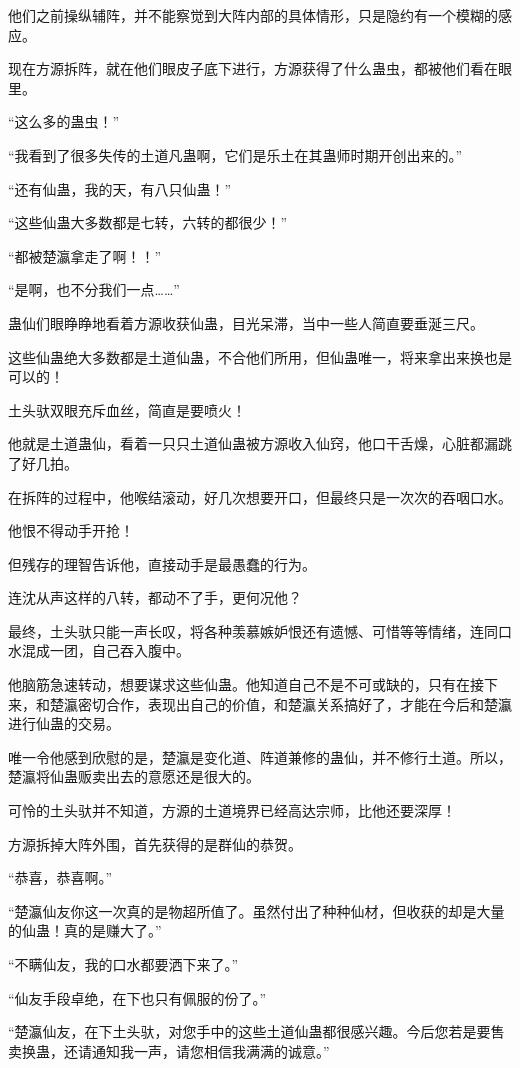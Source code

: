 \begin{this_body}
他们之前操纵辅阵，并不能察觉到大阵内部的具体情形，只是隐约有一个模糊的感应。

现在方源拆阵，就在他们眼皮子底下进行，方源获得了什么蛊虫，都被他们看在眼里。

“这么多的蛊虫！”

“我看到了很多失传的土道凡蛊啊，它们是乐土在其蛊师时期开创出来的。”

“还有仙蛊，我的天，有八只仙蛊！”

“这些仙蛊大多数都是七转，六转的都很少！”

“都被楚瀛拿走了啊！！”

“是啊，也不分我们一点……”

蛊仙们眼睁睁地看着方源收获仙蛊，目光呆滞，当中一些人简直要垂涎三尺。

这些仙蛊绝大多数都是土道仙蛊，不合他们所用，但仙蛊唯一，将来拿出来换也是可以的！

土头驮双眼充斥血丝，简直是要喷火！

他就是土道蛊仙，看着一只只土道仙蛊被方源收入仙窍，他口干舌燥，心脏都漏跳了好几拍。

在拆阵的过程中，他喉结滚动，好几次想要开口，但最终只是一次次的吞咽口水。

他恨不得动手开抢！

但残存的理智告诉他，直接动手是最愚蠢的行为。

连沈从声这样的八转，都动不了手，更何况他？

最终，土头驮只能一声长叹，将各种羡慕嫉妒恨还有遗憾、可惜等等情绪，连同口水混成一团，自己吞入腹中。

他脑筋急速转动，想要谋求这些仙蛊。他知道自己不是不可或缺的，只有在接下来，和楚瀛密切合作，表现出自己的价值，和楚瀛关系搞好了，才能在今后和楚瀛进行仙蛊的交易。

唯一令他感到欣慰的是，楚瀛是变化道、阵道兼修的蛊仙，并不修行土道。所以，楚瀛将仙蛊贩卖出去的意愿还是很大的。

可怜的土头驮并不知道，方源的土道境界已经高达宗师，比他还要深厚！

方源拆掉大阵外围，首先获得的是群仙的恭贺。

“恭喜，恭喜啊。”

“楚瀛仙友你这一次真的是物超所值了。虽然付出了种种仙材，但收获的却是大量的仙蛊！真的是赚大了。”

“不瞒仙友，我的口水都要洒下来了。”

“仙友手段卓绝，在下也只有佩服的份了。”

“楚瀛仙友，在下土头驮，对您手中的这些土道仙蛊都很感兴趣。今后您若是要售卖换蛊，还请通知我一声，请您相信我满满的诚意。”


\end{this_body}
